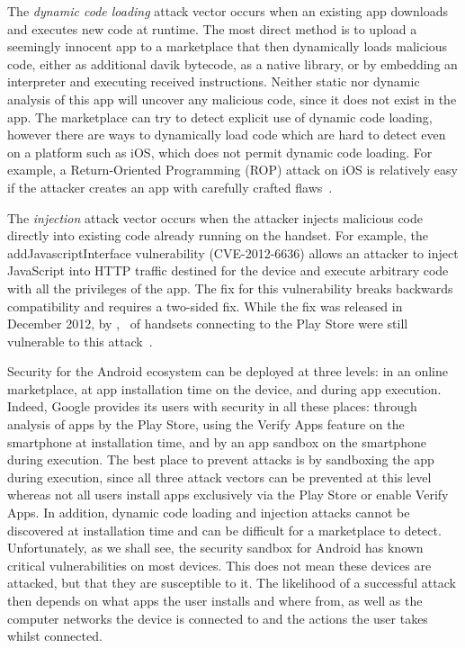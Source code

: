 \documentclass{sig-alternate-2013}
\begin{document}
The \emph{dynamic code loading} attack vector occurs when an existing app downloads and executes new code at runtime.
The most direct method is to upload a seemingly innocent app to a marketplace that then dynamically loads malicious code, either as additional davik bytecode, as a native library, or by embedding an interpreter and executing received instructions.
Neither static nor dynamic analysis of this app will uncover any malicious code, since it does not exist in the app.
The marketplace can try to detect explicit use of dynamic code loading, however there are ways to dynamically load code which are hard to detect even on a platform such as iOS, which does not permit dynamic code loading.
For example, a Return-Oriented Programming (ROP) attack on iOS is relatively easy if the attacker creates an app with carefully crafted flaws~\cite{Wang2013a}.

The \emph{injection} attack vector occurs when the attacker injects malicious code directly into existing code already running on the handset. 
For example, the addJavascriptInterface vulnerability (CVE-2012-6636) allows an attacker to inject JavaScript into HTTP traffic destined for the device and execute arbitrary code with all the privileges of the app.
The fix for this vulnerability breaks backwards compatibility and requires a two-sided fix.
While the fix was released in December 2012, by \daGPAPISeventeenLaterDateMonth, \daGPAPISeventeenEarlierProportion\ of handsets connecting to the Play Store were still vulnerable to this attack~\cite{Thomas2015a}.

Security for the Android ecosystem can be deployed at three levels: in an online marketplace, at app installation time on the device, and during app execution. 
Indeed, Google provides its users with security in all these places: through analysis of apps by the Play Store, using the Verify Apps feature on the smartphone at installation time, and by an app sandbox on the smartphone during execution. 
The best place to prevent attacks is by sandboxing the app during execution, since all three attack vectors can be prevented at this level whereas not all users install apps exclusively via the Play Store or enable Verify Apps.
In addition, dynamic code loading and injection attacks cannot be discovered at installation time and can be difficult for a marketplace to detect.
Unfortunately, as we shall see, the security sandbox for Android has known critical vulnerabilities on most devices.
This does not mean these devices are attacked, but that they are susceptible to it.
The likelihood of a successful attack then depends on what apps the user installs and where from, as well as the computer networks the device is connected to and the actions the user takes whilst connected.
\end{document}
